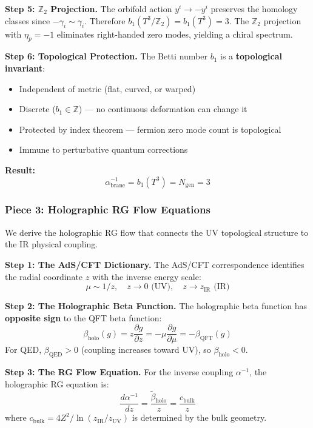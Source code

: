 \documentclass[12pt,a4paper]{article}
\newcommand{\Ztwo}{\mathbb{Z}_2}
\newcommand{\Tthree}{T^3}
\newcommand{\Zsq}{Z^2}
\newcommand{\Ngen}{N_{\text{gen}}}
\begin{document}
\textbf{Step 5: $\Ztwo$ Projection.}
The orbifold action $y^i \to -y^i$ preserves the homology classes since $-\gamma_i \sim \gamma_i$. Therefore $b_1(\Tthree/\Ztwo) = b_1(T^3) = 3$. The $\Ztwo$ projection with $\eta_p = -1$ eliminates right-handed zero modes, yielding a chiral spectrum.

\textbf{Step 6: Topological Protection.}
The Betti number $b_1$ is a \textbf{topological invariant}:
\begin{itemize}
    \item Independent of metric (flat, curved, or warped)
    \item Discrete ($b_1 \in \mathbb{Z}$) --- no continuous deformation can change it
    \item Protected by index theorem --- fermion zero mode count is topological
    \item Immune to perturbative quantum corrections
\end{itemize}

\textbf{Result:}
\begin{equation}
\boxed{\alpha_{\text{brane}}^{-1} = b_1(T^3) = \Ngen = 3}
\end{equation}

\subsubsection{Piece 3: Holographic RG Flow Equations}

We derive the holographic RG flow that connects the UV topological structure to the IR physical coupling.

\textbf{Step 1: The AdS/CFT Dictionary.}
The AdS/CFT correspondence identifies the radial coordinate $z$ with the inverse energy scale:
\begin{equation}
\mu \sim 1/z, \quad z \to 0 \text{ (UV)}, \quad z \to z_{\text{IR}} \text{ (IR)}
\end{equation}

\textbf{Step 2: The Holographic Beta Function.}
The holographic beta function has \textbf{opposite sign} to the QFT beta function:
\begin{equation}
\beta_{\text{holo}}(g) = z \frac{\partial g}{\partial z} = -\mu \frac{\partial g}{\partial \mu} = -\beta_{\text{QFT}}(g)
\end{equation}
For QED, $\beta_{\text{QED}} > 0$ (coupling increases toward UV), so $\beta_{\text{holo}} < 0$.

\textbf{Step 3: The RG Flow Equation.}
For the inverse coupling $\alpha^{-1}$, the holographic RG equation is:
\begin{equation}
\frac{d\alpha^{-1}}{dz} = \frac{\tilde{\beta}_{\text{holo}}}{z} = \frac{c_{\text{bulk}}}{z}
\end{equation}
where $c_{\text{bulk}} = 4\Zsq/\ln(z_{\text{IR}}/z_{\text{UV}})$ is determined by the bulk geometry.
\end{document}
